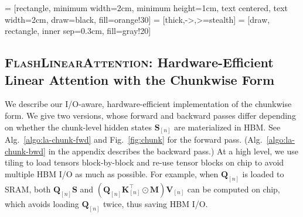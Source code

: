 \usetikzlibrary{arrows.meta,
                positioning,
                shadows}

\usetikzlibrary{shapes.multipart,positioning}

\usetikzlibrary{shapes, arrows, arrows.meta, fit,backgrounds, positioning, calc}

 = [rectangle, minimum width=2cm, minimum height=1cm, text centered, text width=2cm,  draw=black, fill=orange!30]
 = [thick,->,>=stealth]
 = [draw, rectangle, inner sep=0.3cm, fill=gray!20]


\subsection{\textnormal{\textsc{FlashLinearAttention}}: Hardware-Efficient  Linear Attention with the Chunkwise Form}
\label{sec:fla}

We describe our I/O-aware, hardware-efficient implementation of the chunkwise form. We give two versions, whose forward and backward passes differ depending on whether the chunk-level hidden states  ${\mathbf{S}}_{[n]}$ are materialized in HBM. See Alg.~\ref{algo:la-chunk-fwd} and Fig.~\ref{fig:chunk} for the forward pass. (Alg.~\ref{algo:la-chunk-bwd} in the appendix describes the backward pass.)  At a high level, we use tiling to load tensors block-by-block and re-use tensor blocks on chip to avoid multiple HBM I/O as {much} as possible. For example, when ${\mathbf{Q}}_{[n]}$ is loaded to SRAM, both ${\mathbf{Q}}_{[n]}{\mathbf{S}}$ and $({\mathbf{Q}}_{[n]}{\mathbf{K}}_{[n]}^{\top}\odot{\mathbf{M}}){\mathbf{V}}_{[n]}$ can be computed on chip, which avoids loading ${\mathbf{Q}}_{[n]}$ twice, thus saving HBM I/O. 

